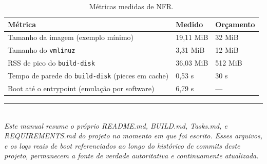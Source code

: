 \documentclass[11pt,letterpaper]{report}
\begin{document}
\begin{table}[h]
\centering
\begin{tabular}{lll}
\toprule
\textbf{Métrica} & \textbf{Medido} & \textbf{Orçamento} \\
\midrule
Tamanho da imagem (exemplo mínimo) & 19,11 MiB & 32 MiB \\
Tamanho do \texttt{vmlinuz} & 3,31 MiB & 12 MiB \\
RSS de pico do \texttt{build-disk} & 36,03 MiB & 512 MiB \\
Tempo de parede do \texttt{build-disk} (pieces em cache) & 0,53 s & 30 s \\
Boot até o entrypoint (emulação por software) & 6,79 s & --- \\
\bottomrule
\end{tabular}
\caption{Métricas medidas de NFR.}
\end{table}

\vfill
\begin{center}
\rule{0.5\textwidth}{0.4pt}\\[0.3cm]
\textit{Este manual resume o próprio README.md, BUILD.md, Tasks.md, e
REQUIREMENTS.md do projeto no momento em que foi escrito. Esses
arquivos, e os logs reais de boot referenciados ao longo do histórico
de commits deste projeto, permanecem a fonte de verdade autoritativa e
continuamente atualizada.}
\end{center}
\end{document}

